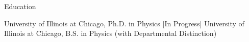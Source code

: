 \begin{rubric}{Education}

  \entry*[2005 --- \ldots] University of Illinois at Chicago, Ph.D. in Physics [In Progress]
  \entry*[2002 --- 2005] University of Illinois at Chicago, B.S. in Physics (with Departmental Distinction)

\end{rubric}
